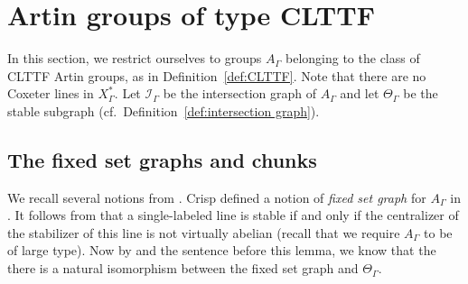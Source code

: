 \documentclass[11pt]{amsart}
\newcommand {\I}{\mathcal I}
\theoremstyle{definition}
\newcommand{\Xa}{X^{\ast}}
\begin{document}
\section{Artin groups of type CLTTF}
\label{sec:CLTTF}
In this section, we restrict ourselves to groups $A_\Gamma$ belonging to the class of CLTTF Artin groups, as in Definition~\ref{def:CLTTF}. Note that there are no Coxeter lines in $\Xa_\Gamma$. Let $\I_\Gamma$ be the intersection graph of $A_\Gamma$ and let $\Theta_\Gamma$ be the stable subgraph (cf.\ Definition~\ref{def:intersection graph}).

\subsection{The fixed set graphs and chunks} 
\label{subsec:fixed set graphs}
We recall several notions from \cite{MR2174269}. Crisp defined a notion of \emph{fixed set graph} for $A_\Gamma$ in \cite[Section 4]{MR2174269}. It follows from \cite[Lemma 9]{MR2174269} that a single-labeled line is stable if and only if the centralizer of the stabilizer of this line is not virtually abelian (recall that we require $A_\Gamma$ to be of large type). Now by \cite[Lemma 12]{MR2174269} and the sentence before this lemma, we know that the there is a natural isomorphism between the fixed set graph and $\Theta_\Gamma$.




\end{document}
